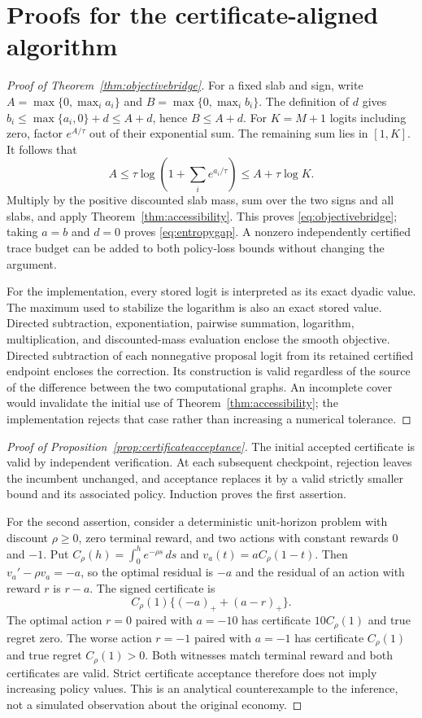\section{Proofs for the certificate-aligned algorithm}\label{app:alignedproofs}
\begin{proof}[Proof of Theorem~\ref{thm:objectivebridge}]
For a fixed slab and sign, write $A=\max\{0,\max_i a_i\}$ and $B=\max\{0,\max_i b_i\}$. The definition of $d$ gives $b_i\leq\max\{a_i,0\}+d\leq A+d$, hence $B\leq A+d$. For $K=M+1$ logits including zero, factor $e^{A/\tau}$ out of their exponential sum. The remaining sum lies in $[1,K]$. It follows that
\[
 A\leq\tau\log(1+\textstyle\sum_i e^{a_i/\tau})\leq A+\tau\log K.
\]
Multiply by the positive discounted slab mass, sum over the two signs and all slabs, and apply Theorem~\ref{thm:accessibility}. This proves \eqref{eq:objectivebridge}; taking $a=b$ and $d=0$ proves \eqref{eq:entropygap}. A nonzero independently certified trace budget can be added to both policy-loss bounds without changing the argument.

For the implementation, every stored logit is interpreted as its exact dyadic value. The maximum used to stabilize the logarithm is also an exact stored value. Directed subtraction, exponentiation, pairwise summation, logarithm, multiplication, and discounted-mass evaluation enclose the smooth objective. Directed subtraction of each nonnegative proposal logit from its retained certified endpoint encloses the correction. Its construction is valid regardless of the source of the difference between the two computational graphs. An incomplete cover would invalidate the initial use of Theorem~\ref{thm:accessibility}; the implementation rejects that case rather than increasing a numerical tolerance.
\end{proof}

\begin{proof}[Proof of Proposition~\ref{prop:certificateacceptance}]
The initial accepted certificate is valid by independent verification. At each subsequent checkpoint, rejection leaves the incumbent unchanged, and acceptance replaces it by a valid strictly smaller bound and its associated policy. Induction proves the first assertion.

For the second assertion, consider a deterministic unit-horizon problem with discount $\rho\geq0$, zero terminal reward, and two actions with constant rewards $0$ and $-1$. Put $C_\rho(h)=\int_0^h e^{-\rho s}\,ds$ and $v_a(t)=aC_\rho(1-t)$. Then $v_a'-\rho v_a=-a$, so the optimal residual is $-a$ and the residual of an action with reward $r$ is $r-a$. The signed certificate is
\[
 C_\rho(1)\{(-a)_++(a-r)_+\}.
\]
The optimal action $r=0$ paired with $a=-10$ has certificate $10C_\rho(1)$ and true regret zero. The worse action $r=-1$ paired with $a=-1$ has certificate $C_\rho(1)$ and true regret $C_\rho(1)>0$. Both witnesses match terminal reward and both certificates are valid. Strict certificate acceptance therefore does not imply increasing policy values. This is an analytical counterexample to the inference, not a simulated observation about the original economy.
\end{proof}


